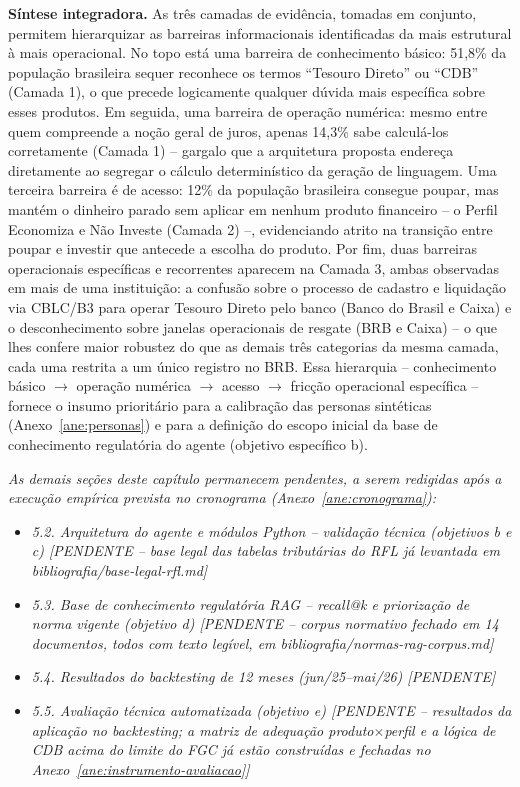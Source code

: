 \textbf{S\'intese integradora.} As tr\^es camadas de evid\^encia, tomadas
em conjunto, permitem hierarquizar as barreiras informacionais
identificadas da mais estrutural \`a mais operacional. No topo est\'a
uma barreira de conhecimento b\'asico: 51,8\% da popula\c{c}\~ao brasileira
sequer reconhece os termos ``Tesouro Direto'' ou ``CDB'' (Camada 1),
o que precede logicamente qualquer d\'uvida mais espec\'ifica sobre esses
produtos. Em seguida, uma barreira de opera\c{c}\~ao num\'erica: mesmo
entre quem compreende a no\c{c}\~ao geral de juros, apenas 14,3\% sabe
calcul\'a-los corretamente (Camada 1) -- gargalo que a arquitetura
proposta endere\c{c}a diretamente ao segregar o c\'alculo determin\'istico
da gera\c{c}\~ao de linguagem. Uma terceira barreira \'e de acesso: 12\%
da popula\c{c}\~ao brasileira consegue poupar, mas mant\'em o dinheiro
parado sem aplicar em nenhum produto financeiro -- o Perfil Economiza e
N\~ao Investe (Camada 2) --, evidenciando atrito na transi\c{c}\~ao entre
poupar e investir que antecede a escolha do produto. Por fim, duas
barreiras operacionais espec\'ificas e recorrentes aparecem na Camada 3,
ambas observadas em mais de uma institui\c{c}\~ao: a confus\~ao sobre o
processo de cadastro e liquida\c{c}\~ao via CBLC/B3 para operar Tesouro
Direto pelo banco (Banco do Brasil e Caixa) e o desconhecimento sobre
janelas operacionais de resgate (BRB e Caixa) -- o que lhes confere
maior robustez do que as demais tr\^es categorias da mesma camada, cada
uma restrita a um \'unico registro no BRB. Essa hierarquia --
conhecimento b\'asico $\rightarrow$ opera\c{c}\~ao num\'erica
$\rightarrow$ acesso $\rightarrow$ fric\c{c}\~ao operacional
espec\'ifica -- fornece o insumo priorit\'ario para a
calibra\c{c}\~ao das personas sint\'eticas (Anexo~\ref{ane:personas}) e
para a defini\c{c}\~ao do escopo inicial da base de conhecimento
regulat\'oria do agente (objetivo espec\'ifico b).

\bigskip
\textit{As demais se\c{c}\~oes deste cap\'itulo permanecem pendentes, a
serem redigidas ap\'os a execu\c{c}\~ao emp\'irica prevista no cronograma
(Anexo~\ref{ane:cronograma}):}

\begin{itemize}
  \item[] \textit{5.2. Arquitetura do agente e m\'odulos Python -- valida\c{c}\~ao t\'ecnica (objetivos b e c) [PENDENTE -- base legal das tabelas tribut\'arias do RFL j\'a levantada em bibliografia/base-legal-rfl.md]}
  \item[] \textit{5.3. Base de conhecimento regulat\'oria RAG -- recall@k e prioriza\c{c}\~ao de norma vigente (objetivo d) [PENDENTE -- corpus normativo fechado em 14 documentos, todos com texto leg\'ivel, em bibliografia/normas-rag-corpus.md]}
  \item[] \textit{5.4. Resultados do backtesting de 12 meses (jun/25--mai/26) [PENDENTE]}
  \item[] \textit{5.5. Avalia\c{c}\~ao t\'ecnica automatizada (objetivo e) [PENDENTE -- resultados da aplica\c{c}\~ao no backtesting; a matriz de adequa\c{c}\~ao produto\texorpdfstring{$\times$}{x}perfil e a l\'ogica de CDB acima do limite do FGC j\'a est\~ao constru\'idas e fechadas no Anexo~\ref{ane:instrumento-avaliacao}]}
\end{itemize}
